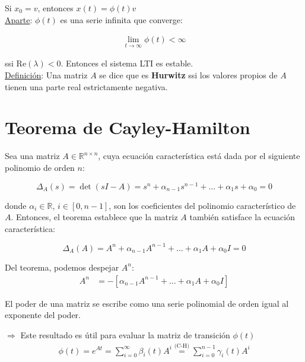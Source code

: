 Si ${x_0}={v}$, entonces ${x}(t)={\phi}(t){v}$\\

\noindent \underline{Aparte}: $\phi(t)$ es una serie infinita que converge:

\begin{align*}
    \lim_{t \to \infty} \phi(t)<\infty     
\end{align*}

\noindent ssi $\text{Re}(\lambda)<0$. Entonces el sistema LTI es estable.\\

\noindent \underline{Definición}: Una matriz ${A}$ se dice que es \textbf{Hurwitz} ssi los valores propios de ${A}$ tienen una parte real estrictamente negativa.


\section{Teorema de Cayley-Hamilton}

\begin{theorem}
    Sea una matriz $A\in\mathbb{R}^{n\times n}$, cuya ecuación característica está dada por el siguiente polinomio de orden $n$:
    
    $$\Delta_A(s)=\det(s{I}-{A})=s^n+\alpha_{n-1}s^{n-1}+...+\alpha_1s+\alpha_0=0$$

    \noindent donde $\alpha_i\in\mathbb{R}$, $i\in [0,n-1]$, son los coeficientes del polinomio característico de ${A}$. Entonces, el teorema establece que la matriz ${A}$ también satisface la ecuación característica:
    
    $$\Delta_A(A) = {A}^n+\alpha_{n-1}{A}^{n-1}+...+\alpha_1{A}+\alpha_0{I}={0}$$
    
\end{theorem}

Del teorema, podemos despejar ${A}^n$:
\begin{align*}
    {A}^n &= -\left[\alpha_{n-1}{A}^{n-1}+...+\alpha_1{A}+\alpha_0{I} \right]
\end{align*}

El poder de una matriz se escribe como una serie polinomial de orden igual al exponente del poder.\\

\par $\Longrightarrow$ Este resultado es útil para evaluar la matriz de transición $\phi(t)$
\begin{align*}
    {\phi(t)}=e^{{A}t}=\sum_{i=0}^\infty \beta_i(t){A}^i \overset{\text{(C-H)}}{=} \sum_{i=0}^{n-1}\gamma_i(t){A}^i
\end{align*}

